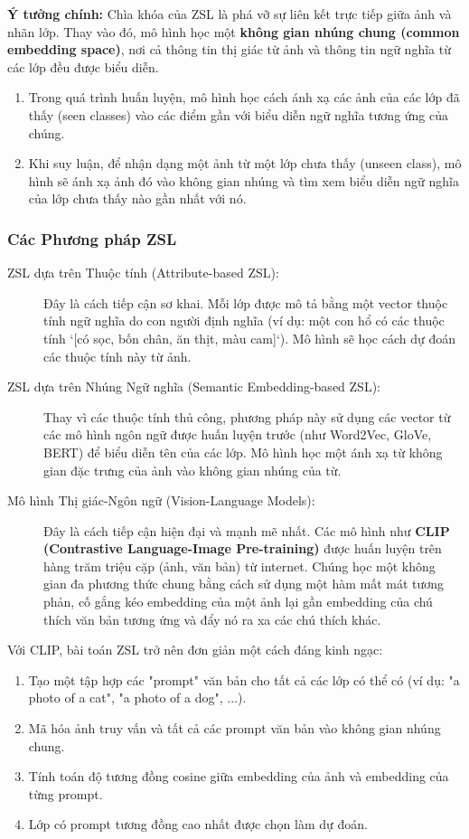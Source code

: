 \textbf{Ý tưởng chính:} Chìa khóa của ZSL là phá vỡ sự liên kết trực tiếp giữa ảnh và nhãn lớp. Thay vào đó, mô hình học một \textbf{không gian nhúng chung (common embedding space)}, nơi cả thông tin thị giác từ ảnh và thông tin ngữ nghĩa từ các lớp đều được biểu diễn.
\begin{enumerate}
	\item Trong quá trình huấn luyện, mô hình học cách ánh xạ các ảnh của các lớp đã thấy (seen classes) vào các điểm gần với biểu diễn ngữ nghĩa tương ứng của chúng.
	\item Khi suy luận, để nhận dạng một ảnh từ một lớp chưa thấy (unseen class), mô hình sẽ ánh xạ ảnh đó vào không gian nhúng và tìm xem biểu diễn ngữ nghĩa của lớp chưa thấy nào gần nhất với nó.
\end{enumerate}

\subsubsection{Các Phương pháp ZSL}
\label{subsubsec:zsl_methods}
\begin{description}
	\item[ZSL dựa trên Thuộc tính (Attribute-based ZSL):] Đây là cách tiếp cận sơ khai. Mỗi lớp được mô tả bằng một vector thuộc tính ngữ nghĩa do con người định nghĩa (ví dụ: một con hổ có các thuộc tính `[có sọc, bốn chân, ăn thịt, màu cam]`). Mô hình sẽ học cách dự đoán các thuộc tính này từ ảnh.
	\item[ZSL dựa trên Nhúng Ngữ nghĩa (Semantic Embedding-based ZSL):] Thay vì các thuộc tính thủ công, phương pháp này sử dụng các vector từ các mô hình ngôn ngữ được huấn luyện trước (như Word2Vec, GloVe, BERT) để biểu diễn tên của các lớp. Mô hình học một ánh xạ từ không gian đặc trưng của ảnh vào không gian nhúng của từ.
	\item[Mô hình Thị giác-Ngôn ngữ (Vision-Language Models):] Đây là cách tiếp cận hiện đại và mạnh mẽ nhất. Các mô hình như \textbf{CLIP (Contrastive Language-Image Pre-training)} \cite{Radford2021} được huấn luyện trên hàng trăm triệu cặp (ảnh, văn bản) từ internet. Chúng học một không gian đa phương thức chung bằng cách sử dụng một hàm mất mát tương phản, cố gắng kéo embedding của một ảnh lại gần embedding của chú thích văn bản tương ứng và đẩy nó ra xa các chú thích khác.
\end{description}
Với CLIP, bài toán ZSL trở nên đơn giản một cách đáng kinh ngạc:
\begin{enumerate}
	\item Tạo một tập hợp các "prompt" văn bản cho tất cả các lớp có thể có (ví dụ: "a photo of a cat", "a photo of a dog", ...).
	\item Mã hóa ảnh truy vấn và tất cả các prompt văn bản vào không gian nhúng chung.
	\item Tính toán độ tương đồng cosine giữa embedding của ảnh và embedding của từng prompt.
	\item Lớp có prompt tương đồng cao nhất được chọn làm dự đoán.
\end{enumerate}

